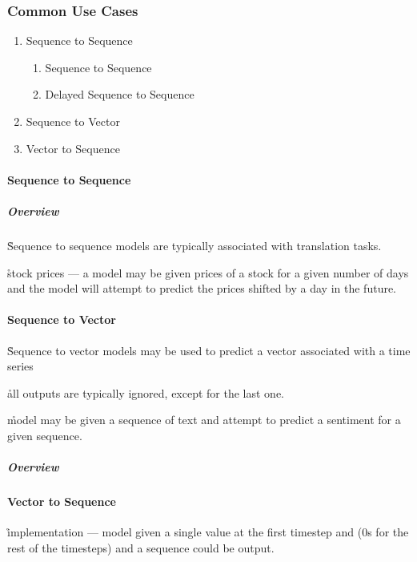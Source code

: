 \subsubsection{Common Use Cases}

\begin{enumerate}[noitemsep,topsep=0pt]
	\item Sequence to Sequence
	\begin{enumerate}[noitemsep,topsep=0pt]
		\item Sequence to Sequence
		\item Delayed Sequence to Sequence
	\end{enumerate}
	\item Sequence to Vector
	\item Vector to Sequence
\end{enumerate}


\paragraph{Sequence to Sequence}

\subparagraph{Overview}


\r{Sequence to sequence models are typically associated with translation tasks.}

\r{stock prices --- a model may be given prices of a stock for a given number of days and the model will attempt to predict the prices shifted by a day in the future.}


\paragraph{Sequence to Vector}

\r{Sequence to vector models may be used to predict a vector associated with a time series}

\r{all outputs are typically ignored, except for the last one.}

\r{model may be given a sequence of text and attempt to predict a sentiment for a given sequence.}

\subparagraph{Overview}


\paragraph{Vector to Sequence}

\r{implementation --- model given a single value at the first timestep and (0s for the rest of the timesteps) and a sequence could be output.}

